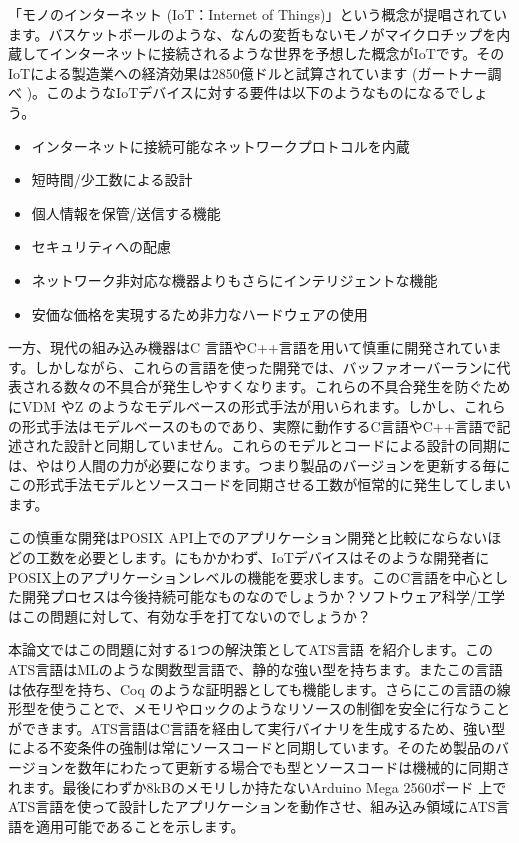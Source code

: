 \documentclass{ipsjprosym}
\begin{document}
「モノのインターネット (IoT：Internet of Things)」という概念が提唱されています。バスケットボールのような、なんの変哲もないモノがマイクロチップを内蔵してインターネットに接続されるような世界を予想した概念がIoTです。そのIoTによる製造業への経済効果は2850億ドルと試算されています (ガートナー調べ \cite{iot_monoist})。このようなIoTデバイスに対する要件は以下のようなものになるでしょう。

\begin{itemize}
\item インターネットに接続可能なネットワークプロトコルを内蔵
\item 短時間/少工数による設計
\item 個人情報を保管/送信する機能
\item セキュリティへの配慮
\item ネットワーク非対応な機器よりもさらにインテリジェントな機能
\item 安価な価格を実現するため非力なハードウェアの使用
\end{itemize}

一方、現代の組み込み機器はC 言語やC++言語を用いて慎重に開発されています。しかしながら、これらの言語を使った開発では、バッファオーバーランに代表される数々の不具合が発生しやすくなります。これらの不具合発生を防ぐためにVDM \cite{vdm} やZ \cite{z_notation} のようなモデルベースの形式手法が用いられます。しかし、これらの形式手法はモデルベースのものであり、実際に動作するC言語やC++言語で記述された設計と同期していません。これらのモデルとコードによる設計の同期には、やはり人間の力が必要になります。つまり製品のバージョンを更新する毎にこの形式手法モデルとソースコードを同期させる工数が恒常的に発生してしまいます。

この慎重な開発はPOSIX API上でのアプリケーション開発と比較にならないほどの工数を必要とします。にもかかわず、IoTデバイスはそのような開発者にPOSIX上のアプリケーションレベルの機能を要求します。このC言語を中心とした開発プロセスは今後持続可能なものなのでしょうか？ソフトウェア科学/工学はこの問題に対して、有効な手を打てないのでしょうか？

本論文ではこの問題に対する1つの解決策としてATS言語 \cite{ats} を紹介します。このATS言語はMLのような関数型言語で、静的な強い型を持ちます。またこの言語は依存型を持ち、Coq \cite{Coq_manual} のような証明器としても機能します。さらにこの言語の線形型を使うことで、メモリやロックのようなリソースの制御を安全に行なうことができます。ATS言語はC言語を経由して実行バイナリを生成するため、強い型による不変条件の強制は常にソースコードと同期しています。そのため製品のバージョンを数年にわたって更新する場合でも型とソースコードは機械的に同期されます。最後にわずか8kBのメモリしか持たないArduino Mega 2560ボード \cite{arduino-mega} 上でATS言語を使って設計したアプリケーションを動作させ、組み込み領域にATS言語を適用可能であることを示します。
\end{document}
